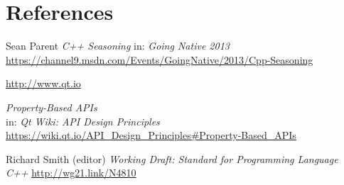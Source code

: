 \documentclass[11pt]{article}
\begin{document}
\section{References}
\renewcommand{\section}[2]{}%
\begin{thebibliography}{9}
  Sean Parent\newline
  \emph{C++ Seasoning}\newline
  in: \emph{Going Native 2013}\newline
  \url{https://channel9.msdn.com/Events/GoingNative/2013/Cpp-Seasoning}

  \url{http://www.qt.io}

  \emph{Property-Based APIs}\\
  in: \emph{Qt Wiki: API Design Principles}\\
  \url{https://wiki.qt.io/API_Design_Principles#Property-Based_APIs}
  
  Richard Smith (editor)\newline
  \emph{Working Draft: Standard for Programming Language C++}\newline
  \url{http://wg21.link/N4810}
\end{thebibliography}
\end{document}
